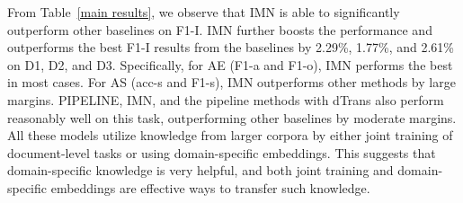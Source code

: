\documentclass[11pt,a4paper]{article}
\begin{document}
 From Table~\ref{main results}, we observe that IMN is able to significantly outperform other baselines on F1-I. IMN further boosts the performance and outperforms the best F1-I results from the baselines by 2.29\%, 1.77\%, and 2.61\%  on D1, D2, and D3.
 Specifically, for AE (F1-a and F1-o), IMN performs the best in most cases.
For AS (acc-s and F1-s), IMN outperforms other methods by large margins. PIPELINE, IMN, and the pipeline methods with dTrans also perform reasonably well on this task, outperforming other baselines by moderate margins. All these models utilize knowledge from larger corpora by either joint training of document-level tasks or using domain-specific embeddings. This suggests that domain-specific knowledge is very helpful, and both joint training and domain-specific embeddings are effective ways to transfer such knowledge. 
 
 
\renewcommand{\arraystretch}{1.2}
\begin{table}[t]
\centering
\small
{}
\caption{F1-I scores of different model variants. Average results over 5 runs are reported.}\label{ablation test}
\end{table}
\end{document}
